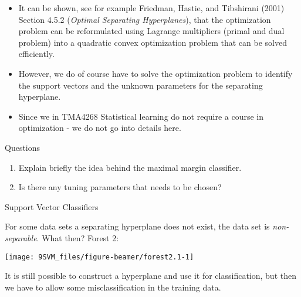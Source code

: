 \documentclass[10pt,ignorenonframetext,]{beamer}
\providecommand{\tightlist}{%
  \setlength{\itemsep}{0pt}\setlength{\parskip}{0pt}}
\begin{document}
\begin{frame}

\begin{itemize}
\tightlist
\item
  It can be shown, see for example Friedman, Hastie, and Tibshirani
  (2001) Section 4.5.2 (\emph{Optimal Separating Hyperplanes}), that the
  optimization problem can be reformulated using Lagrange multipliers
  (primal and dual problem) into a quadratic convex optimization problem
  that can be solved efficiently.
\end{itemize}

\vspace{2mm}

\begin{itemize}
\tightlist
\item
  However, we do of course have to solve the optimization problem to
  identify the support vectors and the unknown parameters for the
  separating hyperplane.
\end{itemize}

\vspace{2mm}

\begin{itemize}
\tightlist
\item
  Since we in TMA4268 Statistical learning do not require a course in
  optimization - we do not go into details here.
\end{itemize}

\end{frame}

\begin{frame}

\begin{block}{Questions}

\begin{enumerate}
\def\labelenumi{\arabic{enumi}.}
\item
  Explain briefly the idea behind the maximal margin classifier.
\item
  Is there any tuning parameters that needs to be chosen?
\end{enumerate}

\end{block}

\end{frame}

\begin{frame}{Support Vector Classifiers}

For some data sets a separating hyperplane does not exist, the data set
is \emph{non-separable}. What then? Forest 2:

\begin{center}\texttt{[image: 9SVM\_files/figure-beamer/forest2.1-1]} \end{center}

It is still possible to construct a hyperplane and use it for
classification, but then we have to allow some misclassification in the
training data.

\end{frame}
\end{document}

